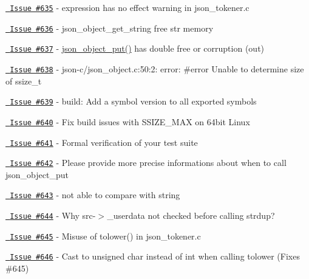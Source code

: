 \begin{DoxyItemize}
\item \href{https://github.com/json-c/json-c/issues/635}{\texttt{ Issue \#635}} -\/ expression has no effect warning in json\+\_\+tokener.\+c
\item \href{https://github.com/json-c/json-c/issues/636}{\texttt{ Issue \#636}} -\/ json\+\_\+object\+\_\+get\+\_\+string free str memory
\item \href{https://github.com/json-c/json-c/issues/637}{\texttt{ Issue \#637}} -\/ \mbox{\hyperlink{json__object_8h_afabf61f932cd64a4122ca8092452eed5}{json\+\_\+object\+\_\+put()}} has \textquotesingle{}double free or corruption (out) \textquotesingle{}
\item \href{https://github.com/json-c/json-c/issues/638}{\texttt{ Issue \#638}} -\/ json-\/c/json\+\_\+object.\+c\+:50\+:2\+: error\+: \#error Unable to determine size of ssize\+\_\+t
\item \href{https://github.com/json-c/json-c/issues/639}{\texttt{ Issue \#639}} -\/ build\+: Add a symbol version to all exported symbols
\item \href{https://github.com/json-c/json-c/issues/640}{\texttt{ Issue \#640}} -\/ Fix build issues with SSIZE\+\_\+\+MAX on 64bit Linux
\item \href{https://github.com/json-c/json-c/issues/641}{\texttt{ Issue \#641}} -\/ Formal verification of your test suite
\item \href{https://github.com/json-c/json-c/issues/642}{\texttt{ Issue \#642}} -\/ Please provide more precise informations about when to call json\+\_\+object\+\_\+put
\item \href{https://github.com/json-c/json-c/issues/643}{\texttt{ Issue \#643}} -\/ not able to compare with string
\item \href{https://github.com/json-c/json-c/issues/644}{\texttt{ Issue \#644}} -\/ Why src-\/$>$\+\_\+userdata not checked before calling strdup?
\item \href{https://github.com/json-c/json-c/issues/645}{\texttt{ Issue \#645}} -\/ Misuse of tolower() in json\+\_\+tokener.\+c
\item \href{https://github.com/json-c/json-c/issues/646}{\texttt{ Issue \#646}} -\/ Cast to unsigned char instead of int when calling tolower (Fixes \#645) 
\end{DoxyItemize}